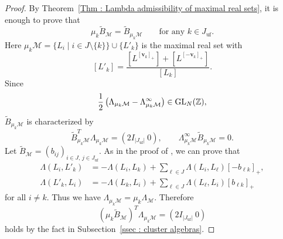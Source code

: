 \begin{proof}
By Theorem~\ref{Thm : Lambda admissibility of maximal real sets},
it is enough to prove that
\[
\mu_k\widetilde{B}_{\mathcal{M}}
= \widetilde{B}_{\mu_k\mathcal{M}}
\qquad\text{for any }k \in J_{\mathrm{uf}}.
\]
Here
$\mu_k\mathcal{M}
= \{L_i \mid i \in J \setminus \{k\}\} \cup \{L'_k\}$
is the maximal real set with
\[
[L'_k] =
\frac{[L^{[\mathbf{v}_k]_+}] + [L^{[-\mathbf{v}_k]_+}]}{[L_k]}.
\]
Since
\[
\frac{1}{2}
\left(\Lambda_{\mu_k\mathcal{M}}
- \Lambda^{\infty}_{\mu_k\mathcal{M}}\right)
\in \mathrm{GL}_N(\mathbb{Z}),
\]
$\widetilde{B}_{\mu_k\mathcal{M}}$ is characterized by
\[
\widetilde{B}_{\mu_k\mathcal{M}}^T\Lambda_{\mu_k\mathcal{M}}
= (2I_{|J_{\mathrm{uf}}|}\ 0),
\qquad
\Lambda^{\infty}_{\mu_k\mathcal{M}}
\widetilde{B}_{\mu_k\mathcal{M}} = 0.
\]
Let
$\widetilde{B}_{\mathcal{M}}
= (b_{ij})_{i \in J,\, j \in J_{\mathrm{uf}}}$.
As in the proof of \cite[Proposition 6.4]{KKOP20},
we can prove that
\[
\begin{aligned}
\Lambda(L_i, L'_k)
&= -\Lambda(L_i, L_k)
+ \sum_{\ell \in J}\Lambda(L_i, L_\ell)[-b_{\ell k}]_+, \\
\Lambda(L'_k, L_i)
&= -\Lambda(L_k, L_i)
+ \sum_{\ell \in J}\Lambda(L_\ell, L_i)[b_{\ell k}]_+
\end{aligned}
\]
for all $i \neq k$.
Thus we have
$\Lambda_{\mu_k\mathcal{M}} = \mu_k\Lambda_{\mathcal{M}}$.
Therefore
\[
(\mu_k\widetilde{B}_{\mathcal{M}})^T
\Lambda_{\mu_k\mathcal{M}} = (2I_{|J_{\mathrm{uf}}|}\ 0)
\]
holds by the fact in Subsection~\ref{ssec : cluster algebras}.


\end{proof}

